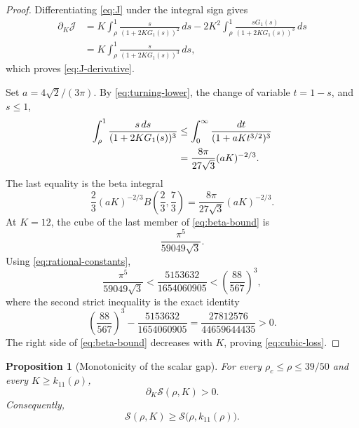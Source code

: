 \documentclass[11pt]{article}
\newtheorem{proposition}[theorem]{Proposition}
\theoremstyle{remark}
\begin{document}
\begin{proof}
Differentiating \eqref{eq:J} under the integral sign gives
\[
 \begin{aligned}
 \partial_K\mathcal J
 &=
 K\int_\rho^1\frac{s}{(1+2KG_1(s))^2}\,ds
 -2K^2\int_\rho^1
 \frac{sG_1(s)}{(1+2KG_1(s))^3}\,ds\\
 &=K\int_\rho^1
 \frac{s}{(1+2KG_1(s))^3}\,ds,
 \end{aligned}
 \]
which proves \eqref{eq:J-derivative}.

Set \(a=4\sqrt2/(3\pi)\).  By \eqref{eq:turning-lower},
the change of variable \(t=1-s\), and \(s\leq1\),
\begin{align}
 \int_\rho^1
 \frac{s\,ds}{(1+2KG_1(s))^3}
 &\leq
 \int_0^\infty\frac{dt}{(1+aKt^{3/2})^3}\notag\\
 &=
 \frac{8\pi}{27\sqrt3}(aK)^{-2/3}.
 \label{eq:beta-bound}
\end{align}
The last equality is the beta integral
\[
 \frac23(aK)^{-2/3}
 B\left(\frac23,\frac73\right)
 =\frac{8\pi}{27\sqrt3}(aK)^{-2/3}.
 \]
At \(K=12\), the cube of the last member of
\eqref{eq:beta-bound} is
\[
 \frac{\pi^5}{59049\sqrt3}.
 \]
Using \eqref{eq:rational-constants},
\[
 \frac{\pi^5}{59049\sqrt3}
 <
 \frac{5153632}{1654060905}
 <
 \left(\frac{88}{567}\right)^3,
 \]
where the second strict inequality is the exact identity
\[
 \left(\frac{88}{567}\right)^3
 -\frac{5153632}{1654060905}
 =\frac{27812576}{44659644435}>0.
 \]
The right side of \eqref{eq:beta-bound} decreases with \(K\), proving
\eqref{eq:cubic-loss}.
\end{proof}

\begin{proposition}[Monotonicity of the scalar gap]
\label{prop:K-monotone}
For every \(\rho_c\leq\rho\leq39/50\) and every
\(K\geq k_{11}(\rho)\),
\begin{equation}
 \partial_K\mathcal S(\rho,K)>0.
 \label{eq:S-monotone}
\end{equation}
Consequently,
\begin{equation}
 \mathcal S(\rho,K)\geq
 \mathcal S\bigl(\rho,k_{11}(\rho)\bigr).
 \label{eq:base-reduction}
\end{equation}
\end{proposition}
\end{document}
